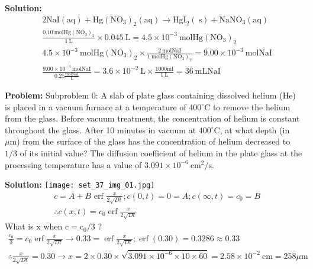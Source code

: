 \documentclass[10pt]{article}
\begin{document}
\textbf{Solution:}
\[
\begin{aligned}
&2 \mathrm{NaI}(\mathrm{aq})+\mathrm{Hg}\left(\mathrm{NO}_{3}\right)_{2}(\mathrm{aq}) \rightarrow \mathrm{HgI}_{2}(\mathrm{~s})+\mathrm{NaNO}_{3}(\mathrm{aq}) \\
&\frac{0.10 \mathrm{~mol} \mathrm{Hg}\left(\mathrm{NO}_{3}\right)_{2}}{1 \mathrm{~L}} \times 0.045 \mathrm{~L}=4.5 \times 10^{-3} \mathrm{~mol} \mathrm{Hg}\left(\mathrm{NO}_{3}\right)_{2} \\
&4.5 \times 10^{-3} \mathrm{~mol} \mathrm{Hg}\left(\mathrm{NO}_{3}\right)_{2} \times \frac{2 \mathrm{~mol} \mathrm{NaI}}{1 \mathrm{~mol} \mathrm{Hg}\left(\mathrm{NO}_{3}\right)_{2}}=9.00 \times 10^{-3} \mathrm{~mol} \mathrm{NaI} \\
&\frac{9.00 \times 10^{-3} \mathrm{~mol} \mathrm{NaI}}{0.25 \frac{\mathrm{mol} \mathrm{NaI}}{\mathrm{L}}}=3.6 \times 10^{-2} \mathrm{~L} \times \frac{1000 \mathrm{ml}}{1 \mathrm{~L}}=\boxed{36} \mathrm{~mL} \mathrm{NaI}
\end{aligned}
\]


\textbf{Problem:}
Subproblem 0: A slab of plate glass containing dissolved helium (He) is placed in a vacuum furnace at a temperature of $400^{\circ} \mathrm{C}$ to remove the helium from the glass. Before vacuum treatment, the concentration of helium is constant throughout the glass. After 10 minutes in vacuum at $400^{\circ} \mathrm{C}$, at what depth (in $\mu \mathrm{m}$) from the surface of the glass has the concentration of helium decreased to $1 / 3$ of its initial value? The diffusion coefficient of helium in the plate glass at the processing temperature has a value of $3.091 \times 10^{-6} \mathrm{~cm}^{2} / \mathrm{s}$.


\textbf{Solution:}
\texttt{[image: set\_37\_img\_01.jpg]}
\nonessentialimage
\[
\begin{aligned}
&c=A+B \text { erf } \frac{x}{2 \sqrt{D t}} ; c(0, t)=0=A ; c(\infty, t)=c_{0}=B \\
&\therefore c(x, t)=c_{0} \operatorname{erf} \frac{x}{2 \sqrt{D t}}
\end{aligned}
\]
What is $\mathrm{x}$ when $\mathrm{c}=\mathrm{c}_{0} / 3$ ?
\[
\begin{gathered}
\frac{c_{0}}{3}=c_{0} \operatorname{erf} \frac{x}{2 \sqrt{D t}} \rightarrow 0.33=\operatorname{erf} \frac{x}{2 \sqrt{D t}} ; \operatorname{erf}(0.30)=0.3286 \approx 0.33 \\
\therefore \frac{x}{2 \sqrt{D t}}=0.30 \rightarrow x=2 \times 0.30 \times \sqrt{3.091 \times 10^{-6} \times 10 \times 60}=2.58 \times 10^{-2} \mathrm{~cm}=\boxed{258} \mu \mathrm{m}
\end{gathered}
\]
\end{document}
